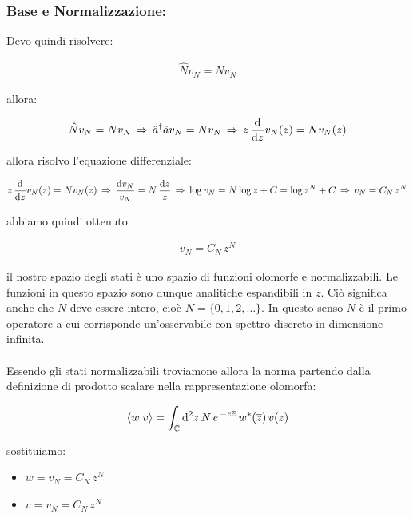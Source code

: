 \subsubsection{Base e Normalizzazione:}

	Devo quindi risolvere:
	
\begin{align*}
	\hat{N} v_{N} = N v_N
\end{align*}
	
	allora:
	
\begin{align*}
	\hat{N} v_{N} = N v_N \, \Rightarrow \, \hat{a}^{\dagger}\hat{a} v_N = N v_N \, \Rightarrow \, z \, \dv{z}v_N(z) = N v_N(z)
\end{align*}
	
	allora risolvo l'equazione differenziale:
	
\begin{align*}
	z \, \dv{z}v_N(z) = N v_N(z) \, \Rightarrow \, \frac{\dd v_N}{v_N} = N \, \frac{\dd z}{z} \, \Rightarrow \, \log v_N = N \log z + C = \log z^N + C \, \Rightarrow \, v_N =  C_N \, z^N
\end{align*}

	abbiamo quindi ottenuto:
	
\begin{align*}
	v_N =  C_N \, z^N
\end{align*}

	il nostro spazio degli stati è uno spazio di funzioni olomorfe e normalizzabili. Le funzioni in questo spazio sono dunque analitiche espandibili in $z$. Ciò significa anche che $N$ deve essere intero, cioè $N = \{ 0, 1, 2, \ldots \}$. In questo senso $N$ è il primo operatore a cui corrisponde un'osservabile con spettro discreto in dimensione infinita.
	\\
	\\
	Essendo gli stati normalizzabili troviamone allora la norma partendo dalla definizione di prodotto scalare nella rappresentazione olomorfa:
	
\begin{align*}
	\braket{w}{v} = \int_{\mathbb{C}} \dd^2 z \, N \, e^{\, -z\overline{z}} \, w^*(\overline{z}) \, v(z)
\end{align*}

	sostituiamo:
	
\begin{itemize}
	\item $w = v_N = C_N \, z^N$
	\item $v = v_N = C_N \, z^N$
\end{itemize}

